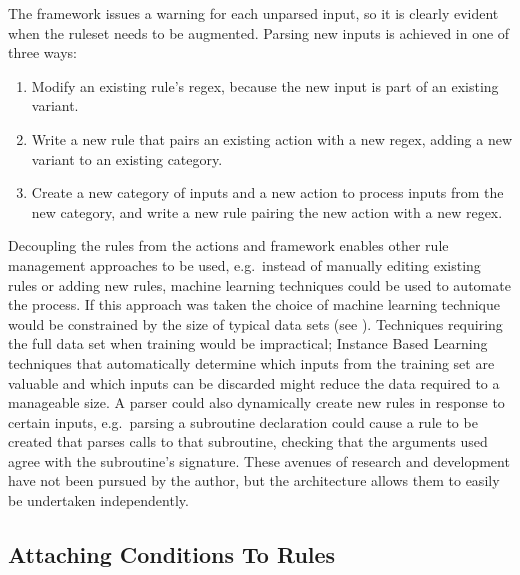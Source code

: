 The framework issues a warning for each unparsed input, so it is clearly
evident when the ruleset needs to be augmented.  Parsing new inputs is
achieved in one of three ways:

\begin{enumerate}

    \item Modify an existing rule's regex, because the new input is part of
        an existing variant.

    \item Write a new rule that pairs an existing action with a new regex,
        adding a new variant to an existing category.

    \item Create a new category of inputs and a new action to process
        inputs from the new category, and write a new rule pairing the new
        action with a new regex.

\end{enumerate}

Decoupling the rules from the actions and framework enables other rule
management approaches to be used, e.g.\ instead of manually editing
existing rules or adding new rules, machine learning techniques could be
used to automate the process.  If this approach was taken the choice of
machine learning technique would be constrained by the size of typical data
sets (see ).  Techniques requiring the full
data set when training would be impractical; Instance Based
Learning~\cite{instance-based-learning} techniques that automatically
determine which inputs from the training set are valuable and which inputs
can be discarded might reduce the data required to a manageable size.  A
parser could also dynamically create new rules in response to certain
inputs, e.g.\ parsing a subroutine declaration could cause a rule to be
created that parses calls to that subroutine, checking that the arguments
used agree with the subroutine's signature.  These avenues of research and
development have not been pursued by the author, but the architecture
allows them to easily be undertaken independently.

\subsection{Attaching Conditions To Rules}

\label{attaching conditions to rules}

\label{rule conditions in architecture}

